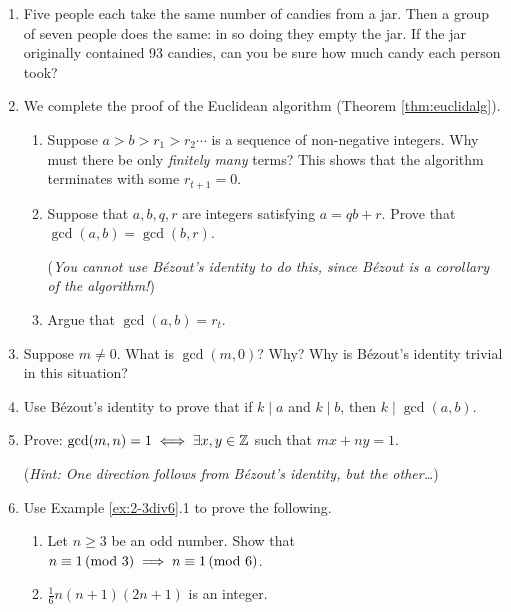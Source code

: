 \begin{exercises}{}{}
\begin{enumerate}
	  \item Five people each take the same number of candies from a jar. Then a group of seven people does the same: in so doing they empty the jar. If the jar originally contained 93 candies, can you be sure how much candy each person took?
	
	
	  \item\label{exs:euclidalgproof} We complete the proof of the Euclidean algorithm (Theorem \ref{thm:euclidalg}).
	  \begin{enumerate}
	    \item Suppose $a>b>r_1>r_2\cdots$ is a sequence of non-negative integers. Why must there be only \emph{finitely many} terms? This shows that the algorithm terminates with some $r_{t+1}=0$.
	    \item Suppose that $a,b,q,r$ are integers satisfying $a=qb+r$. Prove that $\gcd(a,b)=\gcd(b,r)$.\par
	    (\emph{You cannot use Bézout's identity to do this, since Bézout is a corollary of the algorithm!})
	    \item Argue that $\gcd(a,b)=r_t$.
	  \end{enumerate}
	  
	
		\item\label{exs:gcd0} Suppose $m\neq 0$. What is $\gcd(m,0)$? Why? Why is Bézout's identity trivial in this situation?
			
	  
	  \item Use Bézout's identity to prove that if $k\mid a$ and $k\mid b$, then $k\mid\gcd(a,b)$.
	  
	
	  \item\label{ex:gcd1} Prove: $\gcd(m,n)=1\iff\exists x,y\in\mathbb{Z}$ such that $mx+ny=1$.\par
	  (\emph{Hint: One direction follows from Bézout's identity, but the other\ldots})
	    
	    
		\item Use Example \ref{ex:2-3div6}.1 to prove the following.
		\begin{enumerate}
		  \item Let $n\ge 3$ be an odd number. Show that $n\equiv 1\negthickspace\pmod{3}\implies  n\equiv 1\negthickspace\pmod{6}$.
		 	\item $\frac 16n(n+1)(2n+1)$ is an integer.
		\end{enumerate}
	  

\end{enumerate}
\end{exercises}
